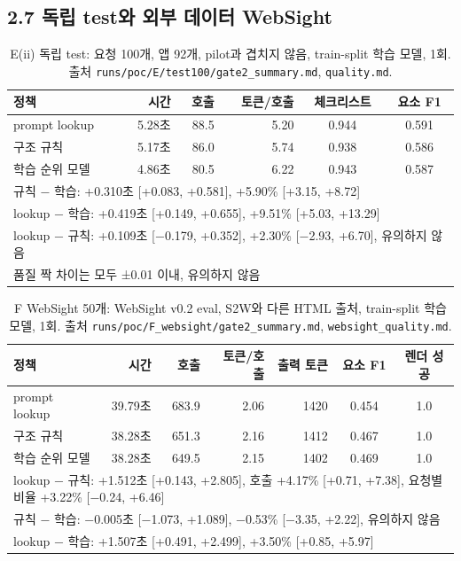 \documentclass[10pt,a4paper]{article}
\begin{document}
\subsection*{2.7 독립 test와 외부 데이터 WebSight}
\begin{table}[H]\centering\small
\caption*{E(ii) 독립 test: 요청 100개, 앱 92개, pilot과 겹치지 않음, train-split 학습 모델, 1회. 출처 \texttt{runs/poc/E/test100/gate2\_summary.md}, \texttt{quality.md}.}
\begin{tabular}{lrrrcc}
\toprule
정책 & 시간 & 호출 & 토큰/호출 & 체크리스트 & 요소 F1\\
\midrule
prompt lookup & 5.28초 & 88.5 & 5.20 & 0.944 & 0.591\\
구조 규칙 & 5.17초 & 86.0 & 5.74 & 0.938 & 0.586\\
학습 순위 모델 & 4.86초 & 80.5 & 6.22 & 0.943 & 0.587\\
\midrule
\multicolumn{6}{l}{규칙 − 학습: +0.310초 [+0.083, +0.581], +5.90\% [+3.15, +8.72]}\\
\multicolumn{6}{l}{lookup − 학습: +0.419초 [+0.149, +0.655], +9.51\% [+5.03, +13.29]}\\
\multicolumn{6}{l}{lookup − 규칙: +0.109초 [−0.179, +0.352], +2.30\% [−2.93, +6.70], 유의하지 않음}\\
\multicolumn{6}{l}{품질 짝 차이는 모두 ±0.01 이내, 유의하지 않음}\\
\bottomrule
\end{tabular}
\end{table}
\begin{table}[H]\centering\small
\caption*{F WebSight 50개: WebSight v0.2 eval, S2W와 다른 HTML 출처, train-split 학습 모델, 1회. 출처 \texttt{runs/poc/F\_websight/gate2\_summary.md}, \texttt{websight\_quality.md}.}
\begin{tabular}{lrrrrcc}
\toprule
정책 & 시간 & 호출 & 토큰/호출 & 출력 토큰 & 요소 F1 & 렌더 성공\\
\midrule
prompt lookup & 39.79초 & 683.9 & 2.06 & 1420 & 0.454 & 1.0\\
구조 규칙 & 38.28초 & 651.3 & 2.16 & 1412 & 0.467 & 1.0\\
학습 순위 모델 & 38.28초 & 649.5 & 2.15 & 1402 & 0.469 & 1.0\\
\midrule
\multicolumn{7}{l}{lookup − 규칙: +1.512초 [+0.143, +2.805], 호출 +4.17\% [+0.71, +7.38], 요청별 비율 +3.22\% [−0.24, +6.46]}\\
\multicolumn{7}{l}{규칙 − 학습: −0.005초 [−1.073, +1.089], −0.53\% [−3.35, +2.22], 유의하지 않음}\\
\multicolumn{7}{l}{lookup − 학습: +1.507초 [+0.491, +2.499], +3.50\% [+0.85, +5.97]}\\
\bottomrule
\end{tabular}
\end{table}
\end{document}

